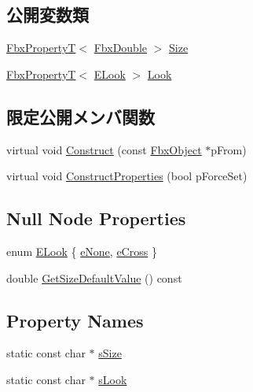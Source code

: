 \subsection*{公開変数類}
\begin{DoxyCompactItemize}
\item 
\hyperlink{class_fbx_property_t}{Fbx\+PropertyT}$<$ \hyperlink{fbxtypes_8h_a171e72a1c46fc15c1a6c9c31948c1c5b}{Fbx\+Double} $>$ \hyperlink{class_fbx_null_a20a712e7191ecd9eb6570a4a50293a40}{Size}
\item 
\hyperlink{class_fbx_property_t}{Fbx\+PropertyT}$<$ \hyperlink{class_fbx_null_aa68cd0be1fca86a79ab603ee99505d78}{E\+Look} $>$ \hyperlink{class_fbx_null_a19a7ff9c2111b18702002f4728013278}{Look}
\end{DoxyCompactItemize}
\subsection*{限定公開メンバ関数}
\begin{DoxyCompactItemize}
\item 
virtual void \hyperlink{class_fbx_null_afb0901136678ef0bbea8cbc9227e9ffd}{Construct} (const \hyperlink{class_fbx_object}{Fbx\+Object} $\ast$p\+From)
\item 
virtual void \hyperlink{class_fbx_null_a5074b9c24389b6b0017e156566469421}{Construct\+Properties} (bool p\+Force\+Set)
\end{DoxyCompactItemize}
\subsection*{Null Node Properties}
\begin{DoxyCompactItemize}
\item 
enum \hyperlink{class_fbx_null_aa68cd0be1fca86a79ab603ee99505d78}{E\+Look} \{ \hyperlink{class_fbx_null_aa68cd0be1fca86a79ab603ee99505d78ad2af5d3ef7bcedf7eea5eea2aa0c0330}{e\+None}, 
\hyperlink{class_fbx_null_aa68cd0be1fca86a79ab603ee99505d78aa5ca9ae8a4d16c590308517c74e8ec78}{e\+Cross}
 \}
\item 
double \hyperlink{class_fbx_null_a2d6dbed70d91457c2d7c50007b8f148e}{Get\+Size\+Default\+Value} () const
\end{DoxyCompactItemize}
\subsection*{Property Names}
\begin{DoxyCompactItemize}
\item 
static const char $\ast$ \hyperlink{class_fbx_null_a4478c6006aabcab2bf8ca2a7b3677601}{s\+Size}
\item 
static const char $\ast$ \hyperlink{class_fbx_null_ac3a4f7217a304a8fd5d9259329874fc2}{s\+Look}
\end{DoxyCompactItemize}
